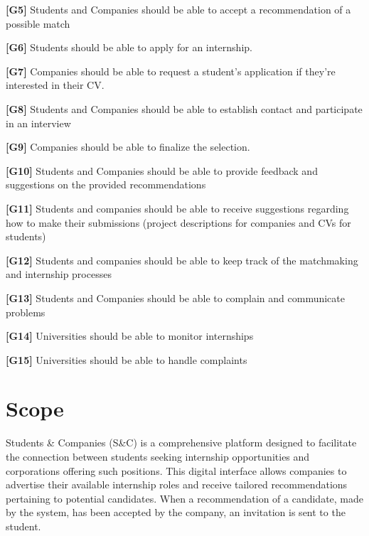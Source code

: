 \textbf{[G5]} Students and Companies should be able to accept a recommendation of a possible match

\textbf{[G6]} Students should be able to apply for an internship.

\textbf{[G7]} Companies should be able to request a student's application if they're interested in their CV.

\textbf{[G8]} Students and Companies should be able to establish contact and participate in an interview

\textbf{[G9]} Companies should be able to finalize the selection.

\textbf{[G10]} Students and Companies should be able to provide feedback and suggestions on the provided recommendations 

\textbf{[G11] }Students and companies should be able to receive suggestions regarding how to make their submissions (project descriptions for companies and CVs for students)

\textbf{[G12]} Students and companies should be able to keep track of the matchmaking and internship processes

\textbf{[G13]} Students and Companies should be able to complain and communicate problems

\textbf{[G14]} Universities should be able to monitor internships

\textbf{[G15]} Universities should be able to handle complaints









\pagebreak
\section{Scope}  
Students \& Companies (S\&C) is a comprehensive platform designed to facilitate the connection between students seeking internship opportunities and corporations offering such positions. This digital interface allows companies to advertise their available internship roles and receive tailored recommendations pertaining to potential candidates. When a recommendation of a candidate, made by the system, has been accepted by the company, an invitation is sent to the student.

